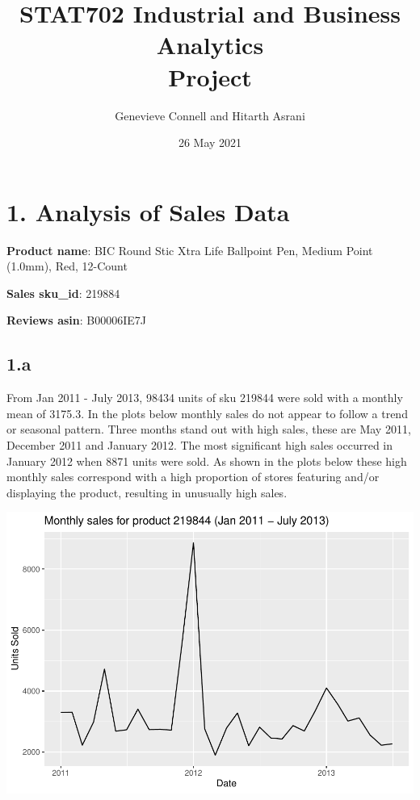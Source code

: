 \documentclass[
  11pt,
]{article}
\title{STAT702 Industrial and Business Analytics\\
Project}
\author{Genevieve Connell and Hitarth Asrani}
\date{26 May 2021}
\begin{document}
\maketitle

\newpage

\hypertarget{analysis-of-sales-data}{%
\section{1. Analysis of Sales Data}\label{analysis-of-sales-data}}

\textbf{Product name}: BIC Round Stic Xtra Life Ballpoint Pen, Medium
Point (1.0mm), Red, 12-Count

\textbf{Sales sku\_id}: 219884

\textbf{Reviews asin}: B00006IE7J

\hypertarget{a}{%
\subsection{1.a}\label{a}}

From Jan 2011 - July 2013, 98434 units of sku 219844 were sold with a
monthly mean of 3175.3. In the plots below monthly sales do not appear
to follow a trend or seasonal pattern. Three months stand out with high
sales, these are May 2011, December 2011 and January 2012. The most
significant high sales occurred in January 2012 when 8871 units were
sold. As shown in the plots below these high monthly sales correspond
with a high proportion of stores featuring and/or displaying the
product, resulting in unusually high sales.

\includegraphics[width=0.6\linewidth]{Assignment-STAT702---final_files/figure-latex/1a monthly sales plot-1}
\end{document}
